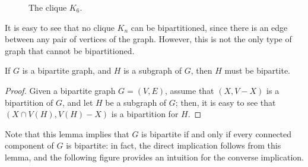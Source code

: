 \documentclass[a4paper, 12pt]{report}
\begin{document}
    \begin{figure}[H]
        \centering
        \caption{The clique $K_6$.}
    \end{figure}

    It is easy to see that no clique $K_n$ can be bipartitioned, since there is an edge between any pair of vertices of the graph. However, this is not the only type of graph that cannot be bipartitioned.

    \begin{framedlem}{}
        If $G$ is a bipartite graph, and $H$ is a subgraph of $G$, then $H$ must be bipartite.
    \end{framedlem}
    
    \begin{proof}
        Given a bipartite graph $G = (V, E)$, assume that $(X, V - X)$ is a bipartition of $G$, and let $H$ be a subgraph of $G$; then, it is easy to see that $(X \cap V(H), V(H) - X)$ is a bipartition for $H$.
    \end{proof}

    Note that this lemma implies that $G$ is bipartite if and only if every connected component of $G$ is bipartite: in fact, the direct implication follows from this lemma, and the following figure provides an intuition for the converse implication.
\end{document}
